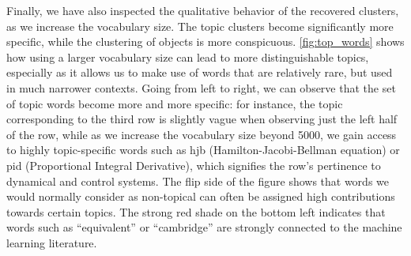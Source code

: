 Finally, we have also inspected the qualitative behavior of the recovered
clusters, as we increase the vocabulary size. The topic clusters become
significantly more specific, while the clustering of objects is more
conspicuous. \cref{fig:top_words} shows how using a larger vocabulary size
can lead to more distinguishable topics, especially as it allows us to make use
of words that are relatively rare, but used in much narrower contexts. Going
from left to right, we can observe that the set of topic words become more and
more specific: for instance, the topic corresponding to the third row is
slightly vague when observing just the left half of the row, while as we
increase the vocabulary size beyond 5000, we gain access to highly
topic\hyp{}specific words such as hjb (Hamilton\hyp{}Jacobi\hyp{}Bellman
equation) or pid (Proportional Integral Derivative), which signifies the row's
pertinence to dynamical and control systems. The flip side of the figure shows
that words we would normally consider as non-topical can often be assigned high
contributions towards certain topics. The strong red shade on the bottom left
indicates that words such as ``equivalent'' or ``cambridge'' are strongly
connected to the machine learning literature.

